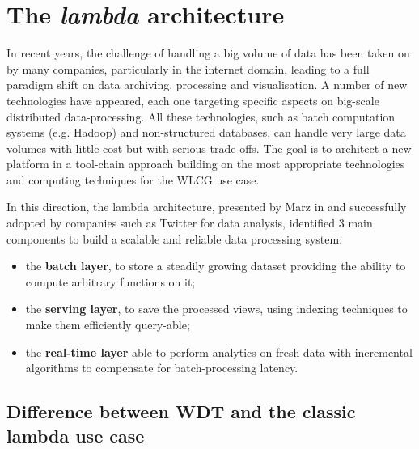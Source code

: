 \section{The \textit{lambda} architecture}

In recent years, the challenge of handling a big volume of data has been taken
on by many companies, particularly in the internet domain, leading to a full
paradigm shift on data archiving, processing and visualisation. A number of new
technologies have appeared, each one targeting specific aspects on big-scale
distributed data-processing. All these technologies, such as batch
computation systems (e.g. Hadoop) and non-structured databases, can handle very
large data volumes with little cost but with serious trade-offs. The goal is to
architect a new platform in a tool-chain approach building on the most
appropriate technologies and computing techniques for the WLCG use case.

In this direction, the lambda architecture, presented by Marz in \cite{lambda} and successfully adopted by companies such as Twitter for data analysis, identified 3 main components to build a scalable and reliable data processing system:
\begin{itemize}
\item  the \textbf{batch layer}, to store a steadily growing dataset providing the ability to compute arbitrary functions on it;
\item  the \textbf{serving layer}, to save the processed views, using indexing techniques to make them efficiently query-able;
\item  the \textbf{real-time layer} able to perform analytics on fresh data with incremental algorithms to compensate for batch-processing latency. 
\end{itemize}


\subsection{Difference between WDT and the classic lambda use case}

